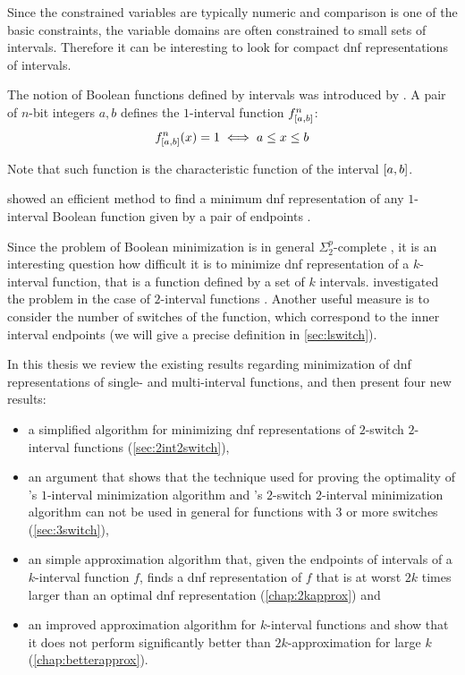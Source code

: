 Since the constrained variables are typically numeric
and comparison is one of the basic constraints,
the variable domains are often constrained
to small sets of intervals.
Therefore it can be interesting to look
for compact \acrshort{dnf}
representations of intervals.

The notion of
Boolean functions defined by intervals was introduced
by \citet{Schieber2005154}.
A pair of $n$-bit integers $a, b$
defines the $1$-interval function
$f^{n}_{[a, b]}$:
$$
f^{n}_{[a, b]} (x) = 1
\iff a \leq x \leq b
$$

Note that such function
is the characteristic function of the interval
$[a, b]$.

\citeauthor{Schieber2005154} showed an efficient method
to find a minimum \acrfull{dnf} representation
of any $1$-interval Boolean function
given by a pair of endpoints \citep{Schieber2005154}.

Since the problem of Boolean minimization is in general
$\Sigma_2^p$-complete \citep{Umans1998},
it is an interesting question how difficult it is
to minimize \acrshort{dnf} representation of
a $k$-interval function,
that is a function defined by a set of $k$ intervals.
\citeauthor{Dubovsky2012} investigated the problem
in the case of $2$-interval functions
\citep{Dubovsky2012}.
Another useful measure
is to consider the number of switches of the function,
which correspond to the inner interval endpoints
(we will give a precise definition
in \cref{sec:lswitch}).

In this thesis we review the existing results regarding
minimization of \acrshort{dnf} representations of
single- and multi-interval functions,
and then present four new results:

\begin{itemize}
\item a simplified algorithm
for minimizing \acrshort{dnf} representations
of $2$-switch
$2$-interval functions (\cref{sec:2int2switch}),

\item
an argument that shows
that the technique used for proving the optimality
of \citeauthor{Schieber2005154}'s
$1$-interval minimization algorithm
\citep{Schieber2005154}
and \citeauthor{Dubovsky2012}'s
$2$-switch $2$-interval minimization algorithm
\citep{Dubovsky2012}
can not be used in general for
functions with $3$ or more switches
(\cref{sec:3switch}),

\item
an simple approximation algorithm that,
given the endpoints of intervals
of a $k$-interval function $f$,
finds a \acrshort{dnf} representation of $f$
that is at worst
$2k$ times larger
than an optimal \acrshort{dnf} representation
(\cref{chap:2kapprox}) and

\item
an improved approximation algorithm
for $k$-interval functions
and show that it does not perform significantly
better than $2k$-approximation for large $k$
(\cref{chap:betterapprox}).
\end{itemize}
